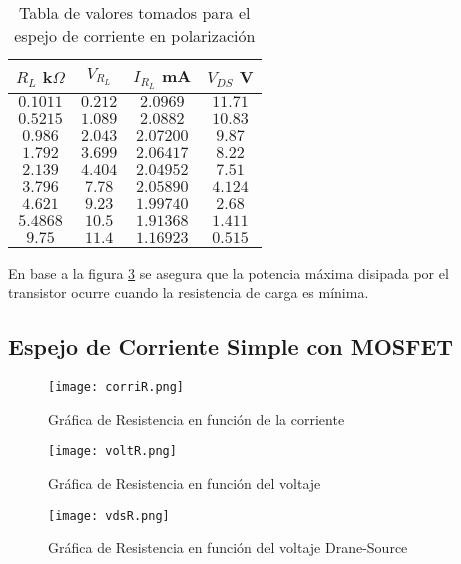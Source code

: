 \documentclass[11pt,graphicx,caption,rotating]{article}
\begin{document}
\begin{table}[H]
	\centering
\begin{tabular}[c]{|c||c|c|c|} \hline
$R_L$ k$\Omega$ & $V_{R_{L}}$ & $I_{R_{L}}$ mA & $V_{DS}$ V \\ \hline
$0.1011$ & $0.212$ & $2.0969$ & $11.71$ \\ \hline
$0.5215$ & $1.089$ & $2.0882$ & $10.83$ \\ \hline
$0.986$ & $2.043$ & $2.07200$ & $9.87$ \\ \hline
$1.792$ & $3.699$ & $2.06417$ & $8.22$ \\ \hline
$2.139$ & $4.404$ & $2.04952$ & $7.51$ \\ \hline
$3.796$ & $7.78$ & $2.05890$ & $4.124$ \\ \hline
$4.621$ & $9.23$ & $1.99740$ & $2.68$ \\ \hline
$5.4868$ & $10.5$ & $1.91368$ & $1.411$ \\ \hline
$9.75$ & $11.4$ & $1.16923$ & $0.515$ \\ \hline
\end{tabular}
	\caption{Tabla de valores tomados para el espejo de corriente en polarización}
	\label{tab16}
\end{table}
\noindent
En base a la figura \ref{fig3} se asegura que la potencia máxima disipada por el transistor
ocurre cuando la resistencia de carga es mínima.

\subsection{Espejo de Corriente Simple con MOSFET}
\noindent

\begin{figure}[H]
	\centering
		\texttt{[image: corriR.png]}
	\caption{Gráfica de Resistencia en función de la corriente}
	\label{fig1}
\end{figure}
\begin{figure}[H]
	\centering
		\texttt{[image: voltR.png]}
	\caption{Gráfica de Resistencia en función del voltaje}
	\label{fig2}
\end{figure}
\begin{figure}[H]
	\centering
		\texttt{[image: vdsR.png]}
	\caption{Gráfica de Resistencia en función del voltaje Drane-Source}
	\label{fig3}
\end{figure}
\end{document}
